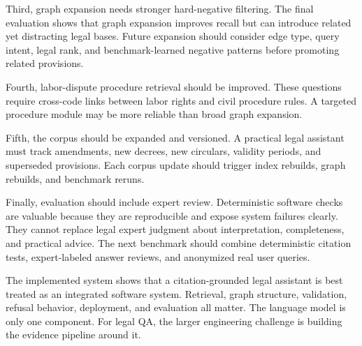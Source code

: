 Third, graph expansion needs stronger hard-negative filtering. The final evaluation shows that graph expansion improves recall but can introduce related yet distracting legal bases. Future expansion should consider edge type, query intent, legal rank, and benchmark-learned negative patterns before promoting related provisions.

Fourth, labor-dispute procedure retrieval should be improved. These questions require cross-code links between labor rights and civil procedure rules. A targeted procedure module may be more reliable than broad graph expansion.

Fifth, the corpus should be expanded and versioned. A practical legal assistant must track amendments, new decrees, new circulars, validity periods, and superseded provisions. Each corpus update should trigger index rebuilds, graph rebuilds, and benchmark reruns.

Finally, evaluation should include expert review. Deterministic software checks are valuable because they are reproducible and expose system failures clearly. They cannot replace legal expert judgment about interpretation, completeness, and practical advice. The next benchmark should combine deterministic citation tests, expert-labeled answer reviews, and anonymized real user queries.

The implemented system shows that a citation-grounded legal assistant is best treated as an integrated software system. Retrieval, graph structure, validation, refusal behavior, deployment, and evaluation all matter. The language model is only one component. For legal QA, the larger engineering challenge is building the evidence pipeline around it.
